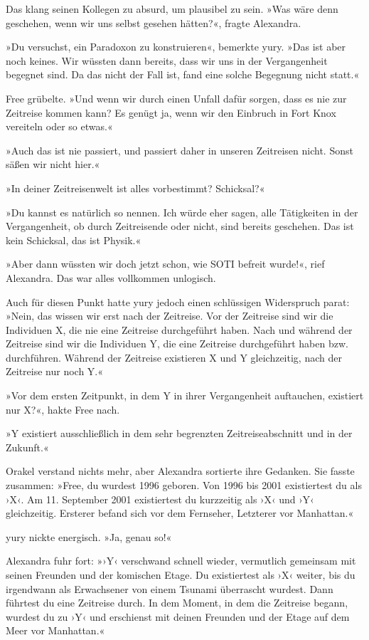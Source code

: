 Das klang seinen Kollegen zu absurd, um plausibel zu sein. »Was wäre denn geschehen, wenn wir uns selbst gesehen hätten?«, fragte Alexandra.

»Du versuchst, ein Paradoxon zu konstruieren«, bemerkte yury. »Das ist aber noch keines. Wir wüssten dann bereits, dass wir uns in der Vergangenheit begegnet sind. Da das nicht der Fall ist, fand eine solche Begegnung nicht statt.«

Free grübelte. »Und wenn wir durch einen Unfall dafür sorgen, dass es nie zur Zeitreise kommen kann? Es genügt ja, wenn wir den Einbruch in Fort Knox vereiteln oder so etwas.«

»Auch das ist nie passiert, und passiert daher in unseren Zeitreisen nicht. Sonst säßen wir nicht hier.«

»In deiner Zeitreisenwelt ist alles vorbestimmt? Schicksal?«

»Du kannst es natürlich so nennen. Ich würde eher sagen, alle Tätigkeiten in der Vergangenheit, ob durch Zeitreisende oder nicht, sind bereits geschehen. Das ist kein Schicksal, das ist Physik.«

»Aber dann wüssten wir doch jetzt schon, wie SOTI befreit wurde!«, rief Alexandra. Das war alles vollkommen unlogisch.

Auch für diesen Punkt hatte yury jedoch einen schlüssigen Widerspruch parat: »Nein, das wissen wir erst nach der Zeitreise. Vor der Zeitreise sind wir die Individuen X, die nie eine Zeitreise durchgeführt haben. Nach und während der Zeitreise sind wir die Individuen Y, die eine Zeitreise durchgeführt haben bzw. durchführen. Während der Zeitreise existieren X und Y gleichzeitig, nach der Zeitreise nur noch Y.«

»Vor dem ersten Zeitpunkt, in dem Y in ihrer Vergangenheit auftauchen, existiert nur X?«, hakte Free nach.

»Y existiert ausschließlich in dem sehr begrenzten Zeitreiseabschnitt und in der Zukunft.«

Orakel verstand nichts mehr, aber Alexandra sortierte ihre Gedanken. Sie fasste zusammen: »Free, du wurdest 1996 geboren. Von 1996 bis 2001 existiertest du als ›X‹. Am 11. September 2001 existiertest du kurzzeitig als ›X‹ und ›Y‹ gleichzeitig. Ersterer befand sich vor dem Fernseher, Letzterer vor Manhattan.«

yury nickte energisch. »Ja, genau so!«

Alexandra fuhr fort: »›Y‹ verschwand schnell wieder, vermutlich gemeinsam mit seinen Freunden und der komischen Etage. Du existiertest als ›X‹ weiter, bis du irgendwann als Erwachsener von einem Tsunami überrascht wurdest. Dann führtest du eine Zeitreise durch. In dem Moment, in dem die Zeitreise begann, wurdest du zu ›Y‹ und erschienst mit deinen Freunden und der Etage auf dem Meer vor Manhattan.«

